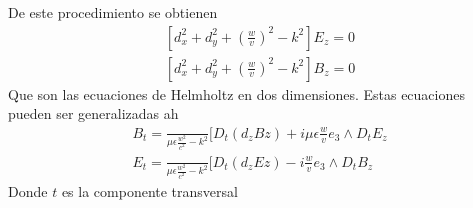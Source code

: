 De este procedimiento se obtienen  
\begin{subequations}\label{Helmholtz}
	\begin{align}
[d_{x}^2+d_{y}^2+(\frac{w}{v})^2-k^2] E_{z}=0\\
[d_{x}^2+d_{y}^2+(\frac{w}{v})^2-k^2] B_{z}=0
	\end{align}
\end{subequations}
Que son las ecuaciones de Helmholtz en dos dimensiones. Estas ecuaciones pueden ser generalizadas ah
\begin{subequations}
	\begin{align}
	B_{t}=\frac{}{\mu \epsilon\frac{w^2}{c^2}-k^2}[D_{t} (d_{z} B{z})+i\mu\epsilon\frac{w}{v}e_{3}\wedge D_{t}E_{z} \\
	E_{t}=\frac{}{\mu \epsilon\frac{w^2}{c^2}-k^2}[D_{t} (d_{z} E{z})-i\frac{w}{v}e_{3}\wedge D_{t}B_{z} 
	\end{align}
	\end{subequations}
Donde $t$ es la componente transversal